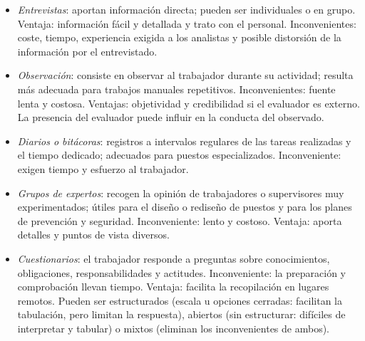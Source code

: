 \documentclass[12pt]{book} %
\providecommand{\tightlist}{%
  \setlength{\itemsep}{0pt}\setlength{\parskip}{0pt}}
\begin{document}
\begin{itemize}
\tightlist
\item
  \emph{Entrevistas}: aportan información directa; pueden ser
  individuales o en grupo. Ventaja: información fácil y detallada y
  trato con el personal. Inconvenientes: coste, tiempo, experiencia
  exigida a los analistas y posible distorsión de la información por el
  entrevistado.
\item
  \emph{Observación}: consiste en observar al trabajador durante su
  actividad; resulta más adecuada para trabajos manuales repetitivos.
  Inconvenientes: fuente lenta y costosa. Ventajas: objetividad y
  credibilidad si el evaluador es externo. La presencia del evaluador
  puede influir en la conducta del observado.
\item
  \emph{Diarios o bitácoras}: registros a intervalos regulares de las
  tareas realizadas y el tiempo dedicado; adecuados para puestos
  especializados. Inconveniente: exigen tiempo y esfuerzo al trabajador.
\item
  \emph{Grupos de expertos}: recogen la opinión de trabajadores o
  supervisores muy experimentados; útiles para el diseño o rediseño de
  puestos y para los planes de prevención y seguridad. Inconveniente:
  lento y costoso. Ventaja: aporta detalles y puntos de vista diversos.
\item
  \emph{Cuestionarios}: el trabajador responde a preguntas sobre
  conocimientos, obligaciones, responsabilidades y actitudes.
  Inconveniente: la preparación y comprobación llevan tiempo. Ventaja:
  facilita la recopilación en lugares remotos. Pueden ser estructurados
  (escala u opciones cerradas: facilitan la tabulación, pero limitan la
  respuesta), abiertos (sin estructurar: difíciles de interpretar y
  tabular) o mixtos (eliminan los inconvenientes de ambos).
\end{itemize}
\end{document}
